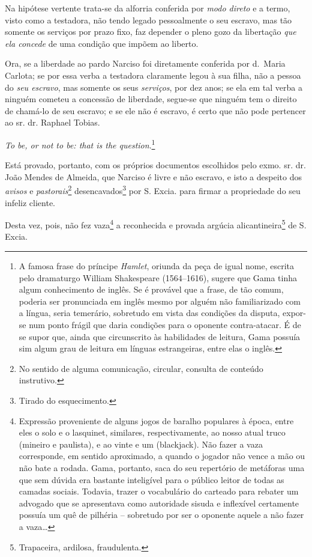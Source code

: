 Na hipótese vertente trata-se da alforria conferida por \emph{modo
direto} e a termo, visto como a testadora, não tendo legado pessoalmente
o seu escravo, mas tão somente os serviços por prazo fixo, faz depender
o pleno gozo da libertação \emph{que ela concede} de uma condição que
impõem ao liberto.

Ora, se a liberdade ao pardo Narciso foi diretamente conferida por
d.~Maria Carlota; se por essa verba a testadora claramente legou à sua
filha, não a pessoa do \emph{seu escravo}, mas somente os seus
\emph{serviços}, por dez anos; se ela em tal verba a ninguém cometeu a
concessão de liberdade, segue-se que ninguém tem o direito de chamá-lo
de seu escravo; e se ele não é escravo, é certo que não pode pertencer
ao sr. dr. Raphael Tobias.

\emph{To be, or not to be: that is the question}.\footnote{ A famosa
  frase do príncipe \emph{Hamlet}, oriunda da peça de igual nome,
  escrita pelo dramaturgo William Shakespeare (1564--1616), sugere que
  Gama tinha algum conhecimento de inglês. Se é provável que a frase, de
  tão comum, poderia ser pronunciada em inglês mesmo por alguém não
  familiarizado com a língua, seria temerário, sobretudo em vista das
  condições da disputa, expor-se num ponto frágil que daria condições
  para o oponente contra-atacar. É de se supor que, ainda que
  circunscrito às habilidades de leitura, Gama possuía sim algum grau de
  leitura em línguas estrangeiras, entre elas o inglês.}

Está provado, portanto, com os próprios documentos escolhidos pelo exmo.
sr. dr. João Mendes de Almeida, que Narciso é livre e não escravo, e
isto a despeito dos \emph{avisos} e \emph{pastorais}\footnote{ No
  sentido de alguma comunicação, circular, consulta de conteúdo
  instrutivo.} desencavados\footnote{ Tirado do esquecimento.} por
S. Excia. para firmar a propriedade do seu infeliz cliente.

Desta vez, pois, não fez vaza\footnote{ Expressão proveniente de
  alguns jogos de baralho populares à época, entre eles o solo e o
  lasquinet, similares, respectivamente, ao nosso atual truco (mineiro e
  paulista), e ao vinte e um (blackjack). Não fazer a vaza corresponde,
  em sentido aproximado, a quando o jogador não vence a mão ou não bate
  a rodada. Gama, portanto, saca do seu repertório de metáforas uma que
  sem dúvida era bastante inteligível para o público leitor de todas as
  camadas sociais. Todavia, trazer o vocabulário do carteado para
  rebater um advogado que se apresentava como autoridade sisuda e
  inflexível certamente possuía um quê de pilhéria -- sobretudo por ser
  o oponente aquele a não fazer a vaza\ldots{}} a reconhecida e provada
argúcia alicantineira\footnote{ Trapaceira, ardilosa, fraudulenta.}
de S. Excia.

